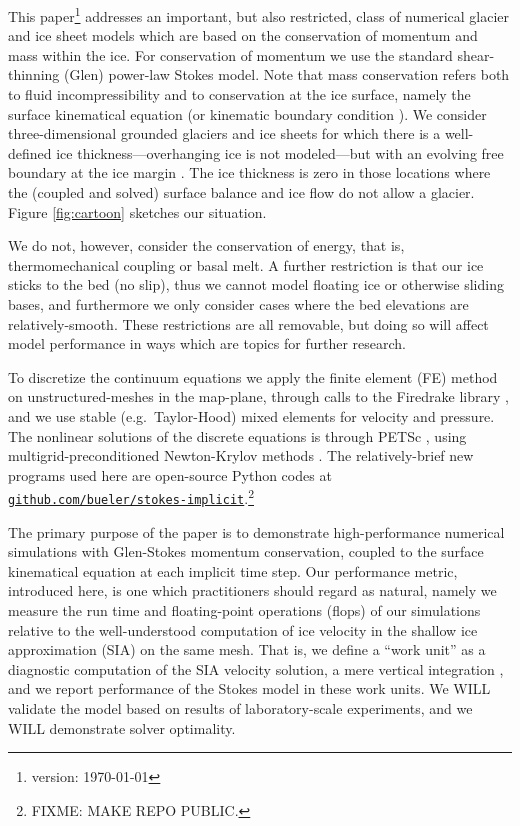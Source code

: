 \documentclass[letterpaper,final,12pt,reqno]{amsart}
\begin{document}
This paper\footnote{version: \today} addresses an important, but also restricted, class of numerical glacier and ice sheet models which are based on the conservation of momentum and mass within the ice.  For conservation of momentum we use the standard shear-thinning (Glen) power-law Stokes model.  Note that mass conservation refers both to fluid incompressibility and to conservation at the ice surface, namely the surface kinematical equation (or kinematic boundary condition \cite{GreveBlatter2009}).  We consider three-dimensional grounded glaciers and ice sheets for which there is a well-defined ice thickness---overhanging ice is not modeled---but with an evolving free boundary at the ice margin \cite{SchoofHewitt2013}.  The ice thickness is zero in those locations where the (coupled and solved) surface balance and ice flow do not allow a glacier.  Figure \ref{fig:cartoon} sketches our situation.

We do not, however, consider the conservation of energy, that is, thermomechanical coupling or basal melt.  A further restriction is that our ice sticks to the bed (no slip), thus we cannot model floating ice or otherwise sliding bases, and furthermore we only consider cases where the bed elevations are relatively-smooth.  These restrictions are all removable, but doing so will affect model performance in ways which are topics for further research.

To discretize the continuum equations we apply the finite element (FE) method \cite{Elmanetal2014} on unstructured-meshes in the map-plane, through calls to the Firedrake library \cite{Rathgeberetal2016}, and we use stable (e.g.~Taylor-Hood) mixed elements for velocity and pressure.  The nonlinear solutions of the discrete equations is through PETSc \cite{Balayetal2020}, using multigrid-preconditioned Newton-Krylov methods \cite{Bueler2021}.  The relatively-brief new programs used here are open-source Python codes at \href{https://github.com/bueler/stokes-implicit}{\texttt{github.com/bueler/stokes-implicit}}.\footnote{FIXME: MAKE REPO PUBLIC.}

The primary purpose of the paper is to demonstrate high-performance numerical simulations with Glen-Stokes momentum conservation, coupled to the surface kinematical equation at each implicit time step.  Our performance metric, introduced here, is one which practitioners should regard as natural, namely we measure the run time and floating-point operations (flops) of our simulations relative to the well-understood computation of ice velocity in the shallow ice approximation (SIA) on the same mesh.  That is, we define a ``work unit'' as a diagnostic computation of the SIA velocity solution, a mere vertical integration \cite{SchoofHewitt2013}, and we report performance of the Stokes model in these work units.  We WILL validate the model based on results of laboratory-scale experiments, and we WILL demonstrate solver optimality.
\end{document}
